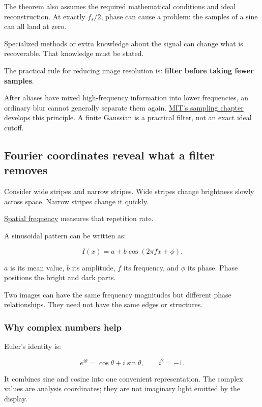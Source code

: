 The theorem also assumes the required mathematical conditions and ideal reconstruction. At exactly \(f_s/2\), phase can cause a problem: the samples of a sine can all land at zero.

Specialized methods or extra knowledge about the signal can change what is recoverable. That knowledge must be stated.

The practical rule for reducing image resolution is: \textbf{filter before taking fewer samples}.

After aliases have mixed high-frequency information into lower frequencies, an ordinary blur cannot generally separate them again. \href{https://visionbook.mit.edu/sampling_and_aliasing.html}{MIT's sampling chapter} develops this principle. A finite Gaussian is a practical filter, not an exact ideal cutoff.

\subsection{Fourier coordinates reveal what a filter removes}\label{04-visual-computing-ii-ch043-fourier-coordinates-reveal-what-a-filter-removes}

Consider wide stripes and narrow stripes. Wide stripes change brightness slowly across space. Narrow stripes change it quickly.

\hyperref[appendix-b60686ba06a1]{Spatial frequency} measures that repetition rate.

A sinusoidal pattern can be written as:

\[
I(x)=a+b\cos(2\pi fx+\phi).
\]

\(a\) is its mean value, \(b\) its amplitude, \(f\) its frequency, and \(\phi\) its phase. Phase positions the bright and dark parts.

Two images can have the same frequency magnitudes but different phase relationships. They need not have the same edges or structures.

\subsubsection{Why complex numbers help}\label{04-visual-computing-ii-ch043-why-complex-numbers-help}

Euler's identity is:

\[
e^{i\theta}=\cos\theta+i\sin\theta,\qquad i^2=-1.
\]

It combines sine and cosine into one convenient representation. The complex values are analysis coordinates; they are not imaginary light emitted by the display.

